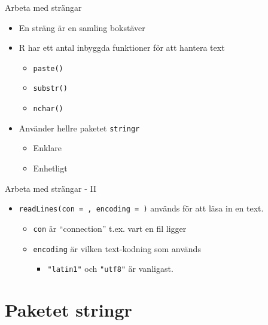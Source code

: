 \documentclass[
  11pt,
  ignorenonframetext,
  handout]{beamer}
\providecommand{\tightlist}{%
  \setlength{\itemsep}{0pt}\setlength{\parskip}{0pt}}
\begin{document}
\begin{frame}{Arbeta med strängar}
\protect\hypertarget{arbeta-med-struxe4ngar}{}
\begin{itemize}
\tightlist
\item
  En sträng är en samling bokstäver
\item
  R har ett antal inbyggda funktioner för att hantera text

  \begin{itemize}
  \tightlist
  \item
    \texttt{paste()}
  \item
    \texttt{substr()}
  \item
    \texttt{nchar()}
  \end{itemize}
\item
  Använder hellre paketet \texttt{stringr}

  \begin{itemize}
  \tightlist
  \item
    Enklare
  \item
    Enhetligt
  \end{itemize}
\end{itemize}
\end{frame}

\begin{frame}{Arbeta med strängar - II}
\protect\hypertarget{arbeta-med-struxe4ngar---ii}{}
\begin{itemize}
\tightlist
\item
  \texttt{readLines(con = , encoding = )} används för att läsa in en
  text.

  \begin{itemize}
  \tightlist
  \item
    \texttt{con} är ``connection'' t.ex. vart en fil ligger
  \item
    \texttt{encoding} är vilken text-kodning som används

    \begin{itemize}
    \tightlist
    \item
      \texttt{"latin1"} och \texttt{"utf8"} är vanligast.
    \end{itemize}
  \end{itemize}
\end{itemize}
\end{frame}

\hypertarget{paketet-stringr}{%
\section{Paketet stringr}\label{paketet-stringr}}
\end{document}
